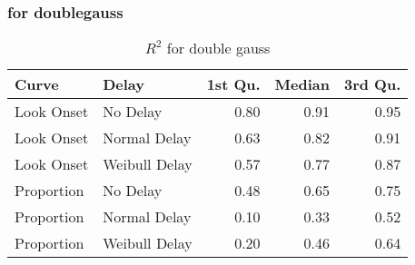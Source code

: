 \subsubsection{for doublegauss}

\begin{table}[H]
\centering
\begin{tabular}{llrrr}
  \hline
Curve & Delay & 1st Qu. & Median & 3rd Qu. \\ 
  \hline
Look Onset & No Delay & 0.80 & 0.91 & 0.95 \\ 
  Look Onset & Normal Delay & 0.63 & 0.82 & 0.91 \\ 
  Look Onset & Weibull Delay & 0.57 & 0.77 & 0.87 \\ 
  Proportion & No Delay & 0.48 & 0.65 & 0.75 \\ 
  Proportion & Normal Delay & 0.10 & 0.33 & 0.52 \\ 
  Proportion & Weibull Delay & 0.20 & 0.46 & 0.64 \\ 
   \hline
\end{tabular}
\caption{$R^2$ for double gauss}
\label{tab:r2_dg_sims}
\end{table}
